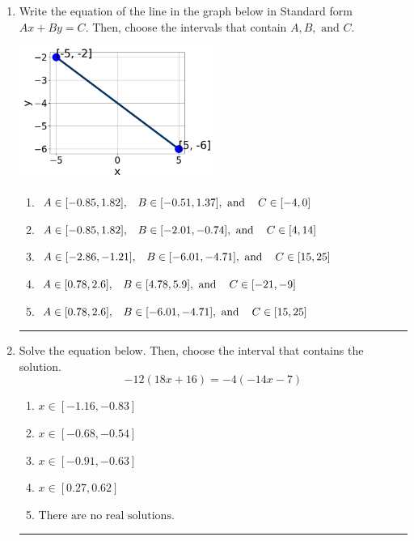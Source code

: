 \documentclass[14pt]{extbook}
\newcommand{\litem}[1]{\item#1\hspace*{-1cm}\rule{\textwidth}{0.4pt}}
\begin{document}
\begin{enumerate}
{\begin{enumerate}[label=\Alph*.]
\end{enumerate} }
\litem{
Write the equation of the line in the graph below in Standard form $Ax+By=C$. Then, choose the intervals that contain $A, B, \text{ and } C$.
\begin{center}
    \includegraphics[width=0.5\textwidth]{../Figures/linearGraphToStandardB.png}
\end{center}
\begin{enumerate}[label=\Alph*.]
\item \( A \in [-0.85, 1.82], \hspace{3mm} B \in [-0.51, 1.37], \text{ and } \hspace{3mm} C \in [-4, 0] \)
\item \( A \in [-0.85, 1.82], \hspace{3mm} B \in [-2.01, -0.74], \text{ and } \hspace{3mm} C \in [4, 14] \)
\item \( A \in [-2.86, -1.21], \hspace{3mm} B \in [-6.01, -4.71], \text{ and } \hspace{3mm} C \in [15, 25] \)
\item \( A \in [0.78, 2.6], \hspace{3mm} B \in [4.78, 5.9], \text{ and } \hspace{3mm} C \in [-21, -9] \)
\item \( A \in [0.78, 2.6], \hspace{3mm} B \in [-6.01, -4.71], \text{ and } \hspace{3mm} C \in [15, 25] \)

\end{enumerate} }
\litem{
Solve the equation below. Then, choose the interval that contains the solution.\[ -12(18x + 16) = -4(-14x -7) \]\begin{enumerate}[label=\Alph*.]
\item \( x \in [-1.16, -0.83] \)
\item \( x \in [-0.68, -0.54] \)
\item \( x \in [-0.91, -0.63] \)
\item \( x \in [0.27, 0.62] \)
\item \( \text{There are no real solutions.} \)


\end{enumerate}}
\end{enumerate}
\end{document}
